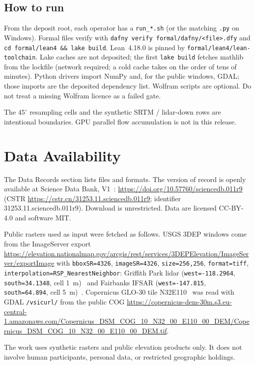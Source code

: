\documentclass[11pt,a4paper]{article}
\begin{document}
\subsection{How to run}

From the deposit root, each operator has a \texttt{run\_*.sh} (or the
matching \texttt{.py} on Windows). Formal files verify with
\texttt{dafny verify formal/dafny/<file>.dfy} and
\texttt{cd formal/lean4 \&\& lake build}. Lean~4.18.0 is pinned by
\texttt{formal/lean4/lean-toolchain}. Lake caches are not deposited;
the first \texttt{lake build} fetches mathlib from the lockfile (network
required; a cold cache takes on the order of tens of minutes).
Python drivers import NumPy and, for the public windows, GDAL; those
imports are the deposited dependency list. Wolfram scripts are optional.
Do not treat a missing Wolfram licence as a failed gate.

The $45^{\circ}$ resampling cells and the synthetic SRTM / lidar-down
rows are intentional boundaries. GPU parallel flow accumulation is not
in this release.

\section{Data Availability}

The Data Records section lists files and formats. The version of record
is openly available at Science Data Bank, V1~\cite{gpbdata}:
\url{https://doi.org/10.57760/sciencedb.011r9}
(CSTR \url{https://cstr.cn/31253.11.sciencedb.011r9};
identifier 31253.11.sciencedb.011r9).
Download is unrestricted. Data are licensed CC-BY-4.0 and software MIT.

Public rasters used as input were fetched as follows. USGS 3DEP windows
come from the ImageServer export
\url{https://elevation.nationalmap.gov/arcgis/rest/services/3DEPElevation/ImageServer/exportImage}
with \texttt{bboxSR=4326}, \texttt{imageSR=4326}, \texttt{size=256,256},
\texttt{format=tiff}, \texttt{interpolation=RSP\_NearestNeighbor}:
Griffith Park lidar (\texttt{west=-118.2964}, \texttt{south=34.1348},
cell 1~m)~\cite{usgs3dep1m} and Fairbanks IFSAR (\texttt{west=-147.815},
\texttt{south=64.894}, cell 5~m)~\cite{usgsifsar}. Copernicus GLO-30 tile
N32E110~\cite{copernicusdem} was read with GDAL \texttt{/vsicurl/} from
the public COG
\url{https://copernicus-dem-30m.s3.eu-central-1.amazonaws.com/Copernicus_DSM_COG_10_N32_00_E110_00_DEM/Copernicus_DSM_COG_10_N32_00_E110_00_DEM.tif}.

The work uses synthetic rasters and public elevation products only. It
does not involve human participants, personal data, or restricted
geographic holdings.
\end{document}
